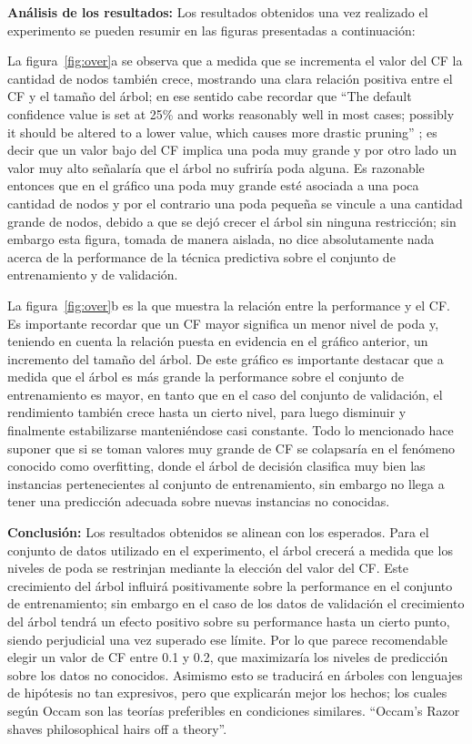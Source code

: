\textbf{Análisis de los resultados:} Los resultados obtenidos una vez realizado el experimento
se pueden resumir en las figuras presentadas a continuación:

La figura~\ref{fig:over}a se observa que a medida que se incrementa el valor del CF la
cantidad de nodos también crece, mostrando una clara relación positiva entre el CF y el
tamaño del árbol; en ese sentido cabe recordar que ``The default confidence value is set at
25\% and works reasonably well in most cases; possibly it should be altered to a lower
value, which causes more drastic pruning'' \cite{witten2005data}; es decir que un valor bajo del CF implica una
poda muy grande y por otro lado un valor muy alto señalaría que el árbol no sufriría poda
alguna. Es razonable entonces que en el gráfico una poda muy grande esté asociada a
una poca cantidad de nodos y por el contrario una poda pequeña se vincule a una
cantidad grande de nodos, debido a que se dejó crecer el árbol sin ninguna restricción; sin
embargo esta figura, tomada de manera aislada, no dice absolutamente nada acerca de la
performance de la técnica predictiva sobre el conjunto de entrenamiento y de validación.

La figura~\ref{fig:over}b es la que muestra la relación entre la performance y el CF. Es
importante recordar que un CF mayor significa un menor nivel de poda y, teniendo en
cuenta la relación puesta en evidencia en el gráfico anterior, un incremento del tamaño del
árbol. De este gráfico es importante destacar que a medida que el árbol es más grande la
performance sobre el conjunto de entrenamiento es mayor, en tanto que en el caso del conjunto
de validación, el rendimiento también crece hasta un cierto nivel, para luego disminuir y
finalmente estabilizarse manteniéndose casi constante. Todo lo mencionado hace
suponer que si se toman valores muy grande de CF se colapsaría en el fenómeno
conocido como overfitting, donde el árbol de decisión clasifica muy bien las instancias 
pertenecientes al conjunto de entrenamiento, sin embargo no llega a tener una predicción
adecuada sobre nuevas instancias no conocidas.


\textbf{Conclusión:} Los resultados obtenidos se alinean con los esperados. Para el conjunto de
datos utilizado en el experimento, el árbol crecerá a medida que los niveles de poda se
restrinjan mediante la elección del valor del CF. Este crecimiento del árbol influirá
positivamente sobre la performance en el conjunto de entrenamiento; sin embargo en el caso
de los datos de validación el crecimiento del árbol tendrá un efecto positivo sobre su
performance hasta un cierto punto, siendo perjudicial una vez superado ese límite. Por lo
que parece recomendable elegir un valor de CF entre 0.1 y 0.2, que maximizaría los
niveles de predicción sobre los datos no conocidos. Asimismo esto se traducirá en árboles
con lenguajes de hipótesis no tan expresivos, pero que explicarán mejor los hechos; los
cuales según Occam son las teorías preferibles en condiciones similares.
``Occam’s Razor shaves philosophical hairs off a theory''.


